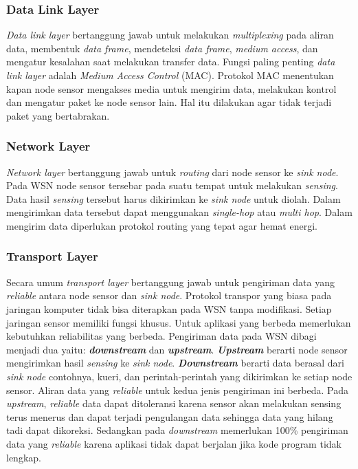 \subsubsection{Data Link Layer}
\textit{Data link layer} bertanggung jawab untuk melakukan \textit{multiplexing} pada aliran data, membentuk \textit{data frame}, mendeteksi \textit{data frame}, \textit{medium access}, dan mengatur kesalahan saat melakukan transfer data. Fungsi paling penting \textit{data link layer} adalah \textit{Medium Access Control} (MAC). Protokol MAC menentukan kapan node sensor mengakses media untuk mengirim data, melakukan kontrol dan mengatur paket ke node sensor lain. Hal itu dilakukan agar tidak terjadi paket yang bertabrakan. 

\subsubsection{Network Layer}
\textit{Network layer} bertanggung jawab untuk \textit{routing} dari node sensor ke \textit{sink node}. Pada WSN node sensor tersebar pada suatu tempat untuk melakukan \textit{sensing}. Data hasil \textit{sensing} tersebut harus dikirimkan ke \textit{sink node} untuk diolah. Dalam mengirimkan data tersebut dapat menggunakan \textit{single-hop} atau \textit{multi hop}. Dalam mengirim data diperlukan protokol routing yang tepat agar hemat energi.

\subsubsection{Transport Layer}
Secara umum \textit{transport layer} bertanggung jawab untuk pengiriman data yang \textit{reliable} antara node sensor dan \textit{sink node}. Protokol transpor yang biasa pada jaringan komputer tidak bisa diterapkan pada WSN tanpa modifikasi. Setiap jaringan sensor memiliki fungsi khusus. Untuk aplikasi yang berbeda memerlukan kebutuhkan reliabilitas yang berbeda. Pengiriman data pada WSN dibagi menjadi dua yaitu: \textbf{\textit{downstream}} dan \textbf{\textit{upstream}}. \textbf{\textit{Upstream}} berarti node sensor mengirimkan hasil \textit{sensing} ke \textit{sink node}. \textbf{\textit{Downstream}} berarti data berasal dari \textit{sink node} contohnya, kueri, dan perintah-perintah yang dikirimkan ke setiap node sensor. Aliran data yang \textit{reliable} untuk kedua jenis pengiriman ini berbeda. Pada \textit{upstream}, \textit{reliable} data dapat ditoleransi karena sensor akan melakukan sensing terus menerus dan dapat terjadi pengulangan data sehingga data yang hilang tadi dapat dikoreksi. Sedangkan pada \textit{downstream} memerlukan 100\% pengiriman data yang \textit{reliable} karena aplikasi tidak dapat berjalan jika kode program tidak lengkap. 


